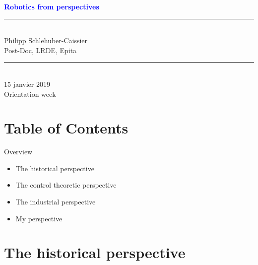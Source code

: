 \documentclass[usenames,dvipsnames,xcolor=table]{beamer}
\date{\today} %
\begin{document}
\begin{frame}
\begin{center}
    \textcolor{blue}{
    \textbf{
    {\Large
    Robotics from perspectives\\[4pt]
    }}
    }
    \rule{.9\linewidth}{2pt}\\[4pt]
    Philipp Schlehuber-Caissier \\
    Post-Doc, LRDE, Epita\\[6pt]
    \rule{.9\linewidth}{2pt}\\[4pt]
 	15 janvier 2019\\
    Orientation week
    
\end{center}
\end{frame}


\section{Table of Contents}

\begin{frame}{Overview}
    \begin{itemize}
        \item The historical perspective
        \item The control theoretic perspective
        \item The industrial perspective
        \item My perspective
    \end{itemize}
\end{frame}

\section{The historical perspective}


\end{document}
